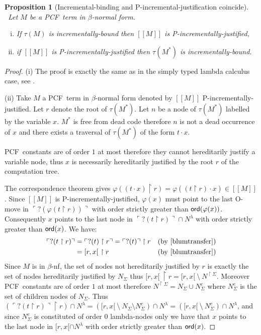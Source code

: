 \documentclass{article}
\newcommand{\sem}[1]{{[\![ #1 ]\!]}}
\newcommand\pcf{\textsf{PCF}}
\newcommand{\pview}[1]{\ulcorner #1 \urcorner}
\newcommand{\ord}[1]{{\sf ord}(#1)}
\newcommand\inter{\cap}
\newcommand\union{\cup}
\newtheorem{proposition}{Proposition}[section]
\theoremstyle{remark}
\theoremstyle{definition}
\begin{document}
\begin{proposition}[Incremental-binding and P-incremental-justification coincide] \
\label{prop:incrbound_imp_incrjustified_pcf} Let $M$ be a \pcf\ term in $\beta$-normal form.
\begin{enumerate}[(i)]
\item  If $\tau(M)$ is incrementally-bound then $\sem{M}$ is P-incrementally-justified,
\item  if $\sem{M}$ is P-incrementally-justified 
then $\tau(M^*)$ is incrementally-bound.
\end{enumerate}
\end{proposition}
\begin{proof}
(i) The proof is exactly the same as in the simply typed lambda calculus case,
see \cite[Proposition 4.1.5(i)]{blumtransfer}.

\noindent (ii)
Take $M$ a \pcf\ term in $\beta$-normal form denoted by
$\sem{M}$ P-incrementally-justified. Let $r$ denote the root of $\tau(M^*)$.
Let $n$ be a node of $\tau(M^*)$ labelled by the variable $x$. $M^*$ is free from dead code therefore $n$ is not a dead occurrence of $x$ and there exists a traversal of $\tau(M^*)$ of the form $t \cdot x$. 

\pcf\ constants are of order $1$ at most therefore they cannot hereditarily justify a variable node, thus $x$ is necessarily hereditarily justified by the root $r$ of the computation tree.


The correspondence theorem gives $\varphi((t \cdot x) \upharpoonright r) = \varphi((t \upharpoonright r) \cdot x) \in \sem{M}$. Since $\sem{M}$ is P-incrementally-justified, $\varphi(x)$
must point to the last O-move in $\pview{?(\varphi(t \upharpoonright
r))}$ with order strictly greater than $\ord{\varphi(x)}$.
Consequently $x$ points to the last node in $\pview{?(t
\upharpoonright r)} \inter N^{\lambda}$ with order strictly greater than $\ord{x}$. We have:
\begin{align*}
\pview{?(t \upharpoonright r)} &= \pview{?(t) \upharpoonright r} = \pview{?(t)} \upharpoonright r & (\mbox{by \cite[lemma 3.1.23]{blumtransfer}}) \\
& = [r,x[ \ \upharpoonright r & (\mbox{by \cite[proposition 3.1.20]{blumtransfer}})
\end{align*}
Since $M$ is in $\beta$-nf, the set of nodes
not hereditarily justified by $r$ is exactly the set of nodes hereditarily justified by $N_{\Sigma}$ thus
$[r,x[ \ \upharpoonright r = [r,x[\ \setminus\  N^{\upharpoonright \Sigma}$.
Moreover \pcf\ constants are of order $1$ at most therefore
$N^{\upharpoonright \Sigma} = N_{\Sigma} \union N^c_{\Sigma}$
where $N^c_{\Sigma}$ is the set of children nodes of $N_{\Sigma}$.
Thus $(\pview{?(t \upharpoonright r)}\upharpoonright r) \inter N^{\lambda} =
([r,x[\ \setminus\  N_{\Sigma} \setminus N^c_{\Sigma} ) \inter N^{\lambda} = 
([r,x[\ \setminus\  N^c_{\Sigma} )  \inter N^{\lambda}$, and
since $N^c_{\Sigma}$ is constituted of order $0$ lambda-nodes only we have that
$x$ points to the last node in $[r,x[ \inter N^{\lambda}$ with order strictly greater than $\ord{x}$.


\end{proof}
\end{document}
